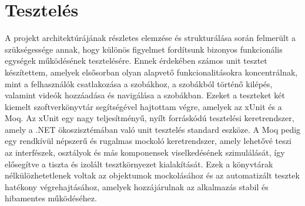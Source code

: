 \section{Tesztelés}
A projekt architektúrájának részletes elemzése és strukturálása során felmerült a szükségessége annak, hogy különös figyelmet fordítsunk bizonyos funkcionális egységek működésének tesztelésére. Ennek érdekében számos unit tesztet készítettem, amelyek elsősorban olyan alapvető funkcionalitásokra koncentrálnak, mint a felhasználók csatlakozása a szobákhoz, a szobákból történő kilépés, valamint videók hozzáadása és navigálása a szobákban. Ezeket a teszteket két kiemelt szoftverkönyvtár segítségével hajtottam végre, amelyek az xUnit és a Moq. Az xUnit egy nagy teljesítményű, nyílt forráskódú tesztelési keretrendszer, amely a .NET ökoszisztémában való unit tesztelés standard eszköze. A Moq pedig egy rendkívül népszerű és rugalmas mockoló keretrendszer, amely lehetővé teszi az interfészek, osztályok és más komponensek viselkedésének szimulálását, így elősegítve a tiszta és izolált tesztkörnyezet kialakítását. Ezek a könyvtárak nélkülözhetetlenek voltak az objektumok mockolásához és az automatizált tesztek hatékony végrehajtásához, amelyek hozzájárulnak az alkalmazás stabil és hibamentes működéséhez.
